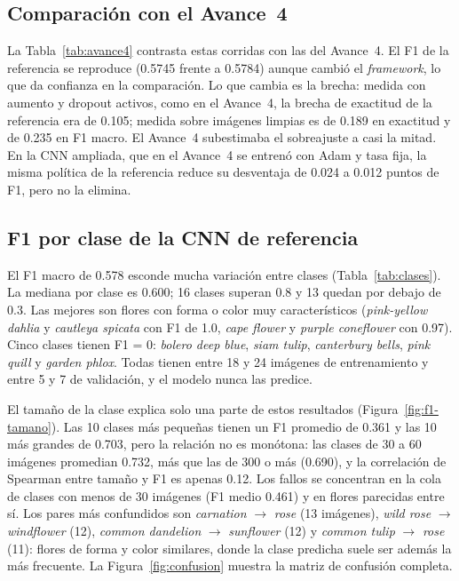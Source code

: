 

\subsection{Comparación con el Avance~4}

La Tabla~\ref{tab:avance4} contrasta estas corridas con las del Avance~4. El F1
de la referencia se reproduce (0.5745 frente a 0.5784) aunque cambió el
\emph{framework}, lo que da confianza en la comparación. Lo que cambia es la
brecha: medida con aumento y dropout activos, como en el Avance~4, la brecha de
exactitud de la referencia era de 0.105; medida sobre imágenes limpias es de
0.189 en exactitud y de 0.235 en F1 macro. El Avance~4 subestimaba el
sobreajuste a casi la mitad. En la CNN ampliada, que en el Avance~4 se entrenó
con Adam y tasa fija, la misma política de la referencia reduce su desventaja de
0.024 a 0.012 puntos de F1, pero no la elimina.



\subsection{F1 por clase de la CNN de referencia}
\label{sec:por-clase}

El F1 macro de 0.578 esconde mucha variación entre clases
(Tabla~\ref{tab:clases}). La mediana por clase es 0.600; 16 clases superan 0.8 y
13 quedan por debajo de 0.3. Las mejores son flores con forma o color muy
característicos (\emph{pink-yellow dahlia} y \emph{cautleya spicata} con F1 de
1.0, \emph{cape flower} y \emph{purple coneflower} con 0.97). Cinco clases tienen
F1 = 0: \emph{bolero deep blue}, \emph{siam tulip}, \emph{canterbury bells},
\emph{pink quill} y \emph{garden phlox}. Todas tienen entre 18 y 24 imágenes de
entrenamiento y entre 5 y 7 de validación, y el modelo nunca las predice.



El tamaño de la clase explica solo una parte de estos resultados
(Figura~\ref{fig:f1-tamano}). Las 10 clases más pequeñas tienen un F1 promedio de
0.361 y las 10 más grandes de 0.703, pero la relación no es monótona: las clases
de 30 a 60 imágenes promedian 0.732, más que las de 300 o más (0.690), y la
correlación de Spearman entre tamaño y F1 es apenas 0.12. Los fallos se
concentran en la cola de clases con menos de 30 imágenes (F1 medio 0.461) y en
flores parecidas entre sí. Los pares más confundidos son \emph{carnation}
$\to$ \emph{rose} (13 imágenes), \emph{wild rose} $\to$ \emph{windflower} (12),
\emph{common dandelion} $\to$ \emph{sunflower} (12) y \emph{common tulip}
$\to$ \emph{rose} (11): flores de forma y color similares, donde la clase
predicha suele ser además la más frecuente. La Figura~\ref{fig:confusion} muestra
la matriz de confusión completa.

